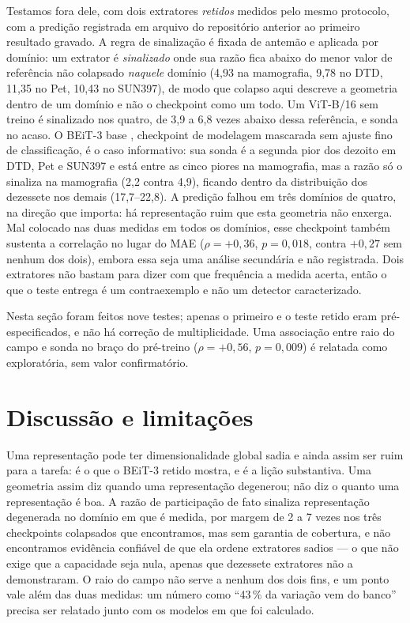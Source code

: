 \documentclass{esannV2}
\begin{document}
Testamos fora dele, com dois extratores \emph{retidos} medidos pelo mesmo
protocolo, com a predição registrada em arquivo do repositório anterior ao
primeiro resultado gravado. A regra de sinalização é fixada de antemão e
aplicada por domínio: um extrator é \emph{sinalizado} onde sua razão fica
abaixo do menor valor de referência não colapsado \emph{naquele} domínio (4,93
na mamografia, 9,78 no DTD, 11,35 no Pet, 10,43 no SUN397), de modo que colapso
aqui descreve a geometria dentro de um domínio e não o checkpoint como um
todo. Um ViT-B/16 sem
treino é sinalizado nos quatro, de 3,9 a 6,8 vezes abaixo dessa referência, e
sonda no acaso. O BEiT-3 base \cite{BEiT3}, checkpoint de modelagem mascarada
sem ajuste fino de classificação, é o caso informativo: sua sonda é a segunda
pior dos dezoito em DTD, Pet e SUN397 e está entre as cinco piores na
mamografia, mas a razão só o sinaliza na mamografia (2,2 contra 4,9), ficando
dentro da distribuição dos dezessete nos demais (17,7--22,8). A predição falhou
em três domínios de quatro, na direção que importa: há representação ruim que
esta geometria não enxerga. Mal colocado nas duas medidas em todos os
domínios, esse checkpoint também sustenta a correlação no lugar do MAE
($\rho = +0{,}36$, $p = 0{,}018$, contra $+0{,}27$ sem nenhum dos dois), embora
essa seja uma análise secundária e não registrada. Dois extratores não bastam
para dizer com que frequência a medida acerta, então o que o teste entrega é um
contraexemplo e não um detector caracterizado.

Nesta seção foram feitos nove testes; apenas o primeiro e o teste retido eram
pré-especificados, e não há correção de multiplicidade. Uma associação entre
raio do campo e sonda no braço do pré-treino ($\rho = +0{,}56$,
$p = 0{,}009$) é relatada como exploratória, sem valor confirmatório.

\section{Discussão e limitações}

Uma representação pode ter dimensionalidade global sadia e ainda assim ser ruim
para a tarefa: é o que o BEiT-3 retido mostra, e é a lição substantiva. Uma
geometria assim diz quando uma representação degenerou; não diz o quanto uma
representação é boa. A razão de participação de fato sinaliza
representação degenerada no domínio em que é medida, por margem de 2 a 7 vezes
nos três checkpoints colapsados que encontramos, mas sem garantia de cobertura,
e não encontramos evidência confiável de que ela ordene extratores sadios ---
o que não exige que a capacidade seja nula, apenas que dezessete extratores não
a demonstraram. O raio do campo não serve a nenhum dos dois fins, e um ponto
vale além das duas medidas: um número como ``43\,\% da variação vem do banco''
precisa ser relatado junto com os modelos em que foi calculado.
\end{document}

